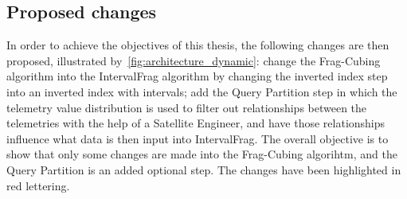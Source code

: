 \subsection{Proposed changes}\label{ch:prop:static:dynamic}

In order to achieve the objectives of this thesis, the following changes are then proposed, illustrated by~\autoref{fig:architecture_dynamic}: change the Frag-Cubing algorithm into the IntervalFrag algorithm by changing the inverted index step into an inverted index with intervals; add the Query Partition step in which the telemetry value distribution is used to filter out relationships between the telemetries with the help of a Satellite Engineer, and have those relationships influence what data is then input into IntervalFrag.
The overall objective is to show that only some changes are made into the Frag-Cubing algorihtm, and the Query Partition is an added optional step.
The changes have been highlighted in red lettering.

